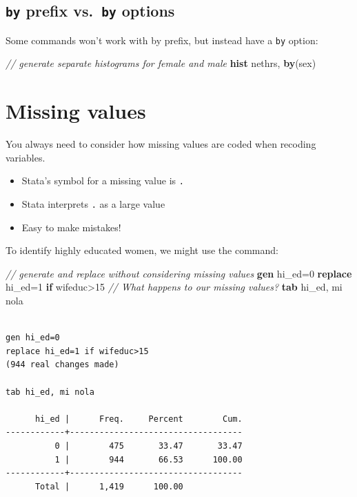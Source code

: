\documentclass[
]{book}
\newenvironment{Shaded}{\begin{snugshade}}{\end{snugshade}}
\newcommand{\CommentTok}[1]{\textcolor[rgb]{0.56,0.35,0.01}{\textit{#1}}}
\newcommand{\FunctionTok}[1]{\textcolor[rgb]{0.00,0.00,0.00}{#1}}
\newcommand{\KeywordTok}[1]{\textcolor[rgb]{0.13,0.29,0.53}{\textbf{#1}}}
\newcommand{\NormalTok}[1]{#1}
\providecommand{\tightlist}{%
  \setlength{\itemsep}{0pt}\setlength{\parskip}{0pt}}
\begin{document}
\hypertarget{by-prefix-vs.-by-options}{%
\subsection{\texorpdfstring{\texttt{by} prefix vs.~\texttt{by} options}{by prefix vs.~by options}}\label{by-prefix-vs.-by-options}}

Some commands won't work with by prefix, but instead have a \texttt{by} option:

\begin{Shaded}
\begin{Highlighting}[]
  \CommentTok{// generate separate histograms for female and male }
  \KeywordTok{hist}\NormalTok{ nethrs, }\KeywordTok{by}\NormalTok{(sex)}
\end{Highlighting}
\end{Shaded}

\hypertarget{missing-values}{%
\section{Missing values}\label{missing-values}}

You always need to consider how missing values are coded when recoding variables.

\begin{itemize}
\tightlist
\item
  Stata's symbol for a missing value is \texttt{.}
\item
  Stata interprets \texttt{.} as a large value
\item
  Easy to make mistakes!
\end{itemize}

To identify highly educated women, we might use the command:

\begin{Shaded}
\begin{Highlighting}[]
  \CommentTok{// generate and replace without considering missing values}
  \KeywordTok{gen}\NormalTok{ hi_ed=0}
  \KeywordTok{replace}\NormalTok{ hi_ed=1 }\KeywordTok{if}\NormalTok{ wifeduc>15}
  \CommentTok{// What happens to our missing values?}
  \KeywordTok{tab}\NormalTok{ hi_ed, }\FunctionTok{mi}\NormalTok{ nola}
\end{Highlighting}
\end{Shaded}

\begin{verbatim}

gen hi_ed=0
replace hi_ed=1 if wifeduc>15
(944 real changes made)

tab hi_ed, mi nola

      hi_ed |      Freq.     Percent        Cum.
------------+-----------------------------------
          0 |        475       33.47       33.47
          1 |        944       66.53      100.00
------------+-----------------------------------
      Total |      1,419      100.00
\end{verbatim}
\end{document}
